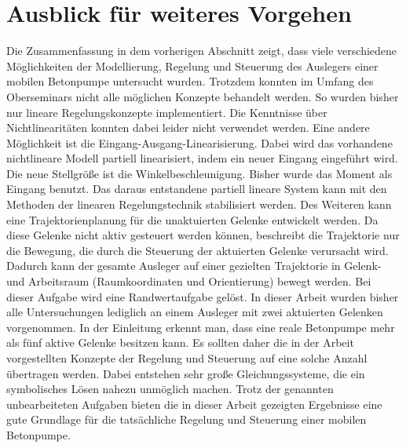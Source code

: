 \section{Ausblick für weiteres Vorgehen}

Die Zusammenfassung in dem vorherigen Abschnitt zeigt, dass viele verschiedene Möglichkeiten der Modellierung, Regelung und Steuerung des Auslegers einer mobilen Betonpumpe untersucht wurden. Trotzdem konnten im Umfang des Oberseminars nicht alle möglichen Konzepte behandelt werden. \newline
So wurden bisher nur lineare Regelungskonzepte implementiert. Die Kenntnisse über Nichtlinearitäten konnten dabei leider nicht verwendet werden. Eine andere Möglichkeit ist die Eingang-Ausgang-Linearisierung. Dabei wird das vorhandene nichtlineare Modell partiell linearisiert, indem ein neuer Eingang eingeführt wird. Die neue Stellgröße ist die Winkelbeschleunigung. Bisher wurde das Moment als Eingang benutzt. Das daraus entstandene partiell lineare System kann mit den Methoden der linearen Regelungstechnik stabilisiert werden. \newline
Des Weiteren kann eine Trajektorienplanung für die unaktuierten Gelenke entwickelt werden. Da diese Gelenke nicht aktiv gesteuert werden können, beschreibt die Trajektorie nur die Bewegung, die durch die Steuerung der aktuierten Gelenke verursacht wird. Dadurch kann der gesamte Ausleger auf einer gezielten Trajektorie in Gelenk- und Arbeitsraum (Raumkoordinaten und Orientierung) bewegt werden. Bei dieser Aufgabe wird  eine Randwertaufgabe gelöst.\newline
In dieser Arbeit wurden bisher alle Untersuchungen lediglich an einem Ausleger mit zwei aktuierten Gelenken vorgenommen. In der Einleitung erkennt man, dass eine reale Betonpumpe mehr als fünf aktive Gelenke besitzen kann. Es sollten daher die in der Arbeit vorgestellten Konzepte der Regelung und Steuerung auf eine solche Anzahl übertragen werden. Dabei entstehen sehr große Gleichungssysteme, die ein symbolisches Lösen nahezu unmöglich machen.\newline
Trotz der genannten unbearbeiteten Aufgaben bieten die in dieser Arbeit gezeigten Ergebnisse eine gute Grundlage für die tatsächliche Regelung und Steuerung einer mobilen Betonpumpe.
